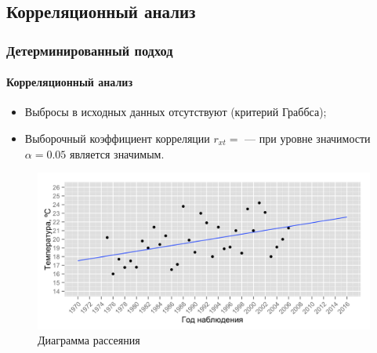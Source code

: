 \documentclass{beamer}
\newcommand{\inp}[1]{}
\newcommand{\characteristic}[2]{\inp{#1/characteristics/#2}}
\begin{document}
\subsection{Корреляционный анализ}
\begin{frame}
  \frametitle{Детерминированный подход}
  \framesubtitle{Корреляционный анализ}
  \begin{multicols}{2}
  \begin{itemize}
    \item Выбросы в исходных данных отсутствуют (критерий Граббса);
    \item Выборочный коэффициент корреляции $ r_{xt} = \characteristic{original}{correlation} $ --- при уровне значимости $ \alpha=0.05 $ является значимым.
  \end{itemize}
  
  \columnbreak
    \begin{figure}[h]
    \includegraphics[width=1\linewidth]{../../figures/original/scatterplot.png}
    \caption{Диаграмма рассеяния}
  \end{figure}
  \end{multicols}
\end{frame}
\end{document}
